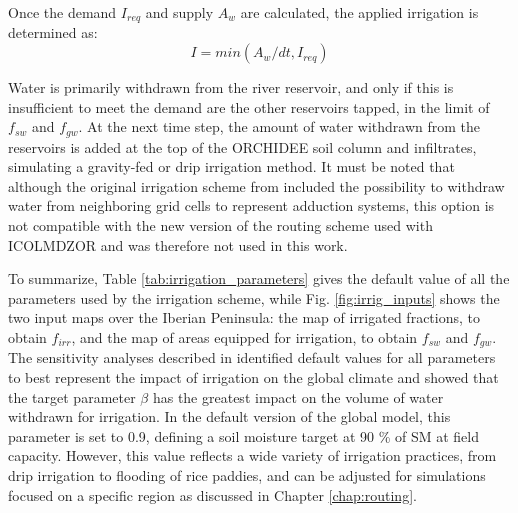 Once the demand $I_{req}$ and supply $A_w$ are calculated, the applied irrigation is determined as:
\begin{equation}
    I = min(A_w/dt, I_{req})
\end{equation}

Water is primarily withdrawn from the river reservoir, and only if this is insufficient to meet the demand are the other reservoirs tapped, in the limit of $f_{sw}$ and $f_{gw}$.
At the next time step, the amount of water withdrawn from the reservoirs is added at the top of the ORCHIDEE soil column and infiltrates, simulating a gravity-fed or drip irrigation method.
It must be noted that although the original irrigation scheme from \citet{arboleda-obando_validation_2024} included the possibility to withdraw water from neighboring grid cells to represent adduction systems, this option is not compatible with the new version of the routing scheme used with ICOLMDZOR and was therefore not used in this work.

To summarize, Table \ref{tab:irrigation_parameters} gives the default value of all the parameters used by the irrigation scheme, while Fig. \ref{fig:irrig_inputs} shows the two input maps over the Iberian Peninsula: the map of irrigated fractions, to obtain $f_{irr}$, and the map of areas equipped for irrigation, to obtain $f_{sw}$ and $f_{gw}$.
The sensitivity analyses described in \citet{arboleda-obando_validation_2024} identified default values for all parameters to best represent the impact of irrigation on the global climate and showed that the target parameter $\beta$ has the greatest impact on the volume of water withdrawn for irrigation.
In the default version of the global model, this parameter is set to 0.9, defining a soil moisture target at 90 \% of SM at field capacity. However, this value reflects a wide variety of irrigation practices, from drip irrigation to flooding of rice paddies, and can be adjusted for simulations focused on a specific region as discussed in Chapter \ref{chap:routing}.

